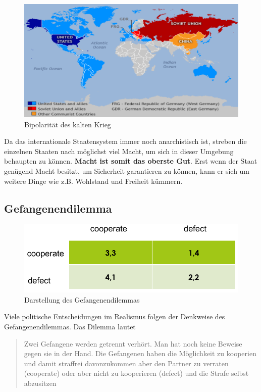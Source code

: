 \documentclass[a4paper, 11pt]{article}
\begin{document}
\begin{figure}[htb]
    \centering
    \includegraphics[keepaspectratio=true,height=15\baselineskip]{bipolaritaet.png}
    \caption{Bipolarität des kalten Krieg}
    \label{fig:bipolaritaet}
\end{figure}

Da das internationale Staatensystem immer noch anarchistisch ist, streben die einzelnen Staaten nach möglichst viel Macht, um sich in dieser Umgebung behaupten zu können. \textbf{Macht ist somit das oberste Gut}. Erst wenn der Staat genügend Macht besitzt, um Sicherheit garantieren zu können, kann er sich um weitere Dinge wie z.B. Wohlstand und Freiheit kümmern.

\subsection{Gefangenendilemma}

\begin{figure}[htb]
    \centering
    \includegraphics[keepaspectratio=true,height=10\baselineskip]{gefangenendilemma.png}
    \caption{Darstellung des Gefangenendilemmas}
    \label{fig:gefangenendilemma}
\end{figure}

Viele politische Entscheidungen im Realismus folgen der Denkweise des Gefangenendilemmas. Das Dilemma lautet

\begin{quote}
	Zwei Gefangene werden getrennt verhört. Man hat noch keine Beweise gegen sie in der Hand. Die Gefangenen haben die Möglichkeit zu kooperien und damit straffrei davonzukommen aber den Partner zu verraten (cooperate) oder aber nicht zu kooperieren (defect) und die Strafe selbst abzusitzen 
\end{quote}
\end{document}
